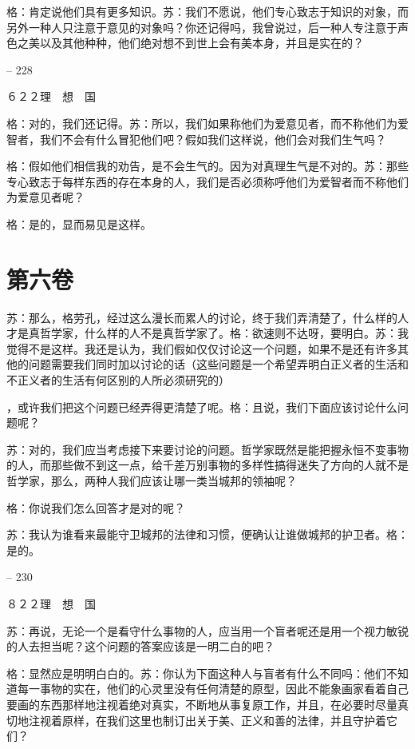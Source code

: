 \documentclass[11pt,oneside]{book}
\begin{document}
\begin{common-format}
    格：肯定说他们具有更多知识。苏：我们不愿说，他们专心致志于知识的对象，而另外一种人只注意于意见的对象吗？你还记得吗，我曾说过，后一种人专注意于声色之美以及其他种种，他们绝对想不到世上会有美本身，并且是实在的？

    

-- 228

    ６２２理　想　国

    格：对的，我们还记得。苏：所以，我们如果称他们为爱意见者，而不称他们为爱智者，我们不会有什么冒犯他们吧？假如我们这样说，他们会对我们生气吗？

    格：假如他们相信我的劝告，是不会生气的。因为对真理生气是不对的。苏：那些专心致志于每样东西的存在本身的人，我们是否必须称呼他们为爱智者而不称他们为爱意见者呢？

    格：是的，显而易见是这样。

    

\chapter{第六卷}
苏：那么，格劳孔，经过这么漫长而累人的讨论，终于我们弄清楚了，什么样的人才是真哲学家，什么样的人不是真哲学家了。格：欲速则不达呀，要明白。苏：我觉得不是这样。我还是认为，我们假如仅仅讨论这一个问题，如果不是还有许多其他的问题需要我们同时加以讨论的话（这些问题是一个希望弄明白正义者的生活和不正义者的生活有何区别的人所必须研究的）

    ，或许我们把这个问题已经弄得更清楚了呢。格：且说，我们下面应该讨论什么问题呢？

    苏：对的，我们应当考虑接下来要讨论的问题。哲学家既然是能把握永恒不变事物的人，而那些做不到这一点，给千差万别事物的多样性搞得迷失了方向的人就不是哲学家，那么，两种人我们应该让哪一类当城邦的领袖呢？

    格：你说我们怎么回答才是对的呢？

    苏：我认为谁看来最能守卫城邦的法律和习惯，便确认让谁做城邦的护卫者。格：是的。

    

-- 230

    ８２２理　想　国

    苏：再说，无论一个是看守什么事物的人，应当用一个盲者呢还是用一个视力敏锐的人去担当呢？这个问题的答案应该是一明二白的吧？

    格：显然应是明明白白的。苏：你认为下面这种人与盲者有什么不同吗：他们不知道每一事物的实在，他们的心灵里没有任何清楚的原型，因此不能象画家看着自己要画的东西那样地注视着绝对真实，不断地从事复原工作，并且，在必要时尽量真切地注视着原样，在我们这里也制订出关于美、正义和善的法律，并且守护着它们？


\end{common-format}
\end{document}

